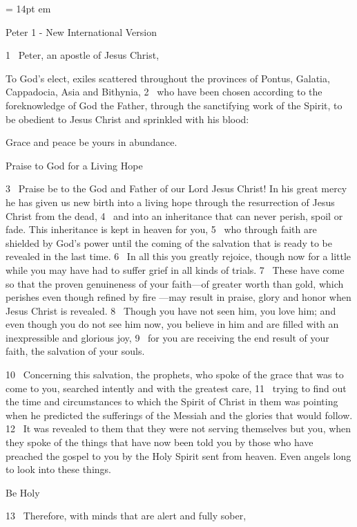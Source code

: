 
\FFrh \baselineskip = 14pt
 em


\centerline{   Peter 1 - New International Version }

\par
1  Peter, an apostle of Jesus Christ,
\par
To God’s elect,
exiles
scattered
throughout the provinces of Pontus,
Galatia,
Cappadocia, Asia and Bithynia,
2  who have been chosen according to the foreknowledge
of God the Father, through the sanctifying work of the Spirit,
to be obedient
to Jesus Christ and sprinkled with his blood:
\par
Grace and peace be yours in abundance.
{\par
Praise to God for a Living Hope
}
\par
3  Praise be to the God and Father of our Lord Jesus Christ!
In his great mercy
he has given us new birth
into a living hope
through the resurrection of Jesus Christ from the dead,
4  and into an inheritance
that can never perish, spoil or fade.
This inheritance is kept in heaven for you,
5  who through faith are shielded by God’s power
until the coming of the salvation
that is ready to be revealed
in the last time.
6  In all this you greatly rejoice,
though now for a little while
you may have had to suffer grief in all kinds of trials.
7  These have come so that the proven genuineness
of your faith—of greater worth than gold, which perishes even though refined by fire
—may result in praise, glory and honor
when Jesus Christ is revealed.
8  Though you have not seen him, you love him; and even though you do not see him now, you believe in him
and are filled with an inexpressible and glorious joy,
9  for you are receiving the end result of your faith, the salvation of your souls.
\par
10  Concerning this salvation, the prophets, who spoke
of the grace that was to come to you,
searched intently and with the greatest care,
11  trying to find out the time and circumstances to which the Spirit of Christ
in them was pointing when he predicted
the sufferings of the Messiah and the glories that would follow.
12  It was revealed to them that they were not serving themselves but you,
when they spoke of the things that have now been told you by those who have preached the gospel to you
by the Holy Spirit sent from heaven.
Even angels long to look into these things.
{\par
Be Holy
}
\par
13  Therefore, with minds that are alert and fully sober,
